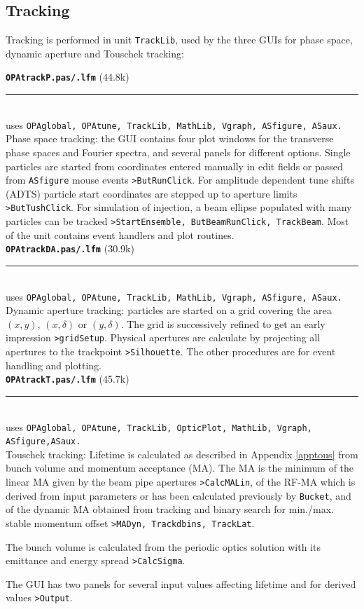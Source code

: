 \documentclass[12pt]{article}
\newcommand\code[1]{{\tt #1}}
\newcommand\opamodule[3]{{\bf \tt #1} #2\\  \rule[3pt]{\textwidth}{0.2pt} \\ {\scriptsize uses \tt  #3}\\[1ex]}
\begin{document}
\subsection{Tracking}
Tracking is performed in unit {\tt TrackLib}, used by the three GUIs for phase space, dynamic aperture and Touschek tracking:

\opamodule{OPAtrackP.pas/.lfm}{(44.8k)}{OPAglobal,  OPAtune, TrackLib, MathLib, Vgraph, ASfigure, ASaux.}
Phase space tracking: the GUI contains four plot windows for the transverse phase spaces and Fourier spectra, and several panels for different options. Single particles are started from coordinates entered manually in edit fields or passed from {\tt ASfigure} mouse events \code{>ButRunClick}. For amplitude dependent tune shifts (ADTS) particle start coordinates are stepped up to aperture limits \code{>ButTushClick}. For simulation of injection, a beam ellipse populated with many particles can be tracked \code{>StartEnsemble, ButBeamRunClick, TrackBeam}. Most of the unit contains event handlers and plot routines.\\

\opamodule{OPAtrackDA.pas/.lfm}{(30.9k)}{OPAglobal,  OPAtune, TrackLib, MathLib, Vgraph, ASfigure, ASaux.}
Dynamic aperture tracking: particles are started on a grid covering the area $(x,y)$, $(x,\delta)$ or $(y,\delta)$. The grid is successively refined to get an early impression \code{>gridSetup}. Physical apertures are calculate by projecting all apertures to the trackpoint \code{>Silhouette}. The other procedures are for event handling and plotting.\\

\opamodule{OPAtrackT.pas/.lfm}{(45.7k)}{OPAglobal,  OPAtune, TrackLib, OpticPlot, MathLib, Vgraph, ASfigure,ASaux.}
Touschek tracking: Lifetime is calculated as described in Appendix \ref{apptous} from bunch volume and momentum acceptance (MA). The MA is the minimum of the linear MA given by the beam pipe apertures \code{>CalcMALin}, of the RF-MA which is derived from input parameters or has been calculated previously by {\tt Bucket}, and of the dynamic MA obtained from tracking and binary search for min./max. stable momentum offset \code{>MADyn, Trackdbins, TrackLat}.

The bunch volume is calculated from the periodic optics solution with its emittance and energy spread \code{>CalcSigma}.

The GUI has two panels for several input values affecting lifetime and for derived values \code{>Output}.
\end{document}
